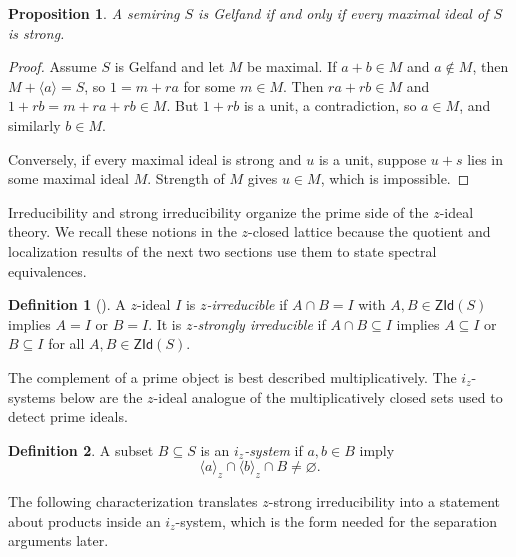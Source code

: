 \documentclass[11pt,leqno]{amsart}
\theoremstyle{plain}
\newtheorem{proposition}[theorem]{Proposition}
\theoremstyle{definition}
\newtheorem{definition}{Definition}[section]
\theoremstyle{remark}
\numberwithin{equation}{section}
\newcommand{\ZId}{\mathsf{ZId}}
\newcommand{\ideal}[1]{\langle #1\rangle}
\begin{document}
\begin{proposition}\label{prop:gelfand-strong-max}
A semiring $S$ is Gelfand if and only if every maximal ideal
of $S$ is strong.
\end{proposition}
\begin{proof}
Assume $S$ is Gelfand and let $M$ be maximal.
If $a+b\in M$ and $a\notin M$, then $M+\ideal{a}=S$,
so $1=m+ra$ for some $m\in M$.
Then $ra+rb\in M$ and $1+rb=m+ra+rb\in M$.
But $1+rb$ is a unit, a contradiction, so $a\in M$,
and similarly $b\in M$.

Conversely, if every maximal ideal is strong and $u$ is a unit,
suppose $u+s$ lies in some maximal ideal $M$.
Strength of $M$ gives $u\in M$, which is impossible.
\end{proof}

Irreducibility and strong irreducibility organize the prime side of
the $z$-ideal theory.
We recall these notions in the $z$-closed lattice because the
quotient and localization results of the next two sections
use them to state spectral equivalences.

\begin{definition}[\cite{AG23}]
A $z$-ideal $I$ is \emph{$z$-irreducible} if $A\cap B=I$ with
$A,B\in\ZId(S)$ implies $A=I$ or $B=I$.
It is \emph{$z$-strongly irreducible} if $A\cap B\subseteq I$
implies $A\subseteq I$ or $B\subseteq I$ for all $A,B\in\ZId(S)$.
\end{definition}

The complement of a prime object is best described multiplicatively.
The $i_z$-systems below are the $z$-ideal analogue of the
multiplicatively closed sets used to detect prime ideals.

\begin{definition}\label{def:iz-system}
A subset $B\subseteq S$ is an \emph{$i_z$-system} if $a,b\in B$ imply
\[
\ideal{a}_z\cap\ideal{b}_z\cap B\neq\varnothing.
\]
\end{definition}

The following characterization translates $z$-strong irreducibility
into a statement about products inside an $i_z$-system,
which is the form needed for the separation arguments later.
\end{document}
